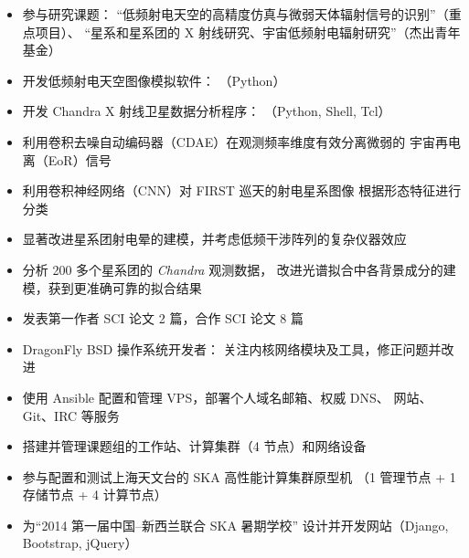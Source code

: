 \documentclass[zh]{resume}
\begin{document}
\begin{itemize}
  \item 参与研究课题：
    \enquote{低频射电天空的高精度仿真与微弱天体辐射信号的识别}（重点项目）、
    \enquote{星系和星系团的 X 射线研究、宇宙低频射电辐射研究}（杰出青年基金）
  \item 开发低频射电天空图像模拟软件：
    （Python）
  \item 开发 Chandra X 射线卫星数据分析程序：
    （Python, Shell, Tcl）
  \item 利用卷积去噪自动编码器（CDAE）在观测频率维度有效分离微弱的
    宇宙再电离（EoR）信号
  \item 利用卷积神经网络（CNN）对 FIRST 巡天的射电星系图像
    根据形态特征进行分类
  \item 显著改进星系团射电晕的建模，并考虑低频干涉阵列的复杂仪器效应
  \item 分析 200 多个星系团的 \textit{Chandra} 观测数据，
    改进光谱拟合中各背景成分的建模，获到更准确可靠的拟合结果
  \item 发表第一作者 SCI 论文 2 篇，合作 SCI 论文 8 篇
\end{itemize}

\begin{itemize}
  \item DragonFly BSD 操作系统开发者：
    关注内核网络模块及工具，修正问题并改进
  \item 使用 Ansible 配置和管理 VPS，部署个人域名邮箱、权威 DNS、
    网站、Git、IRC 等服务
  \item 搭建并管理课题组的工作站、计算集群（4 节点）和网络设备
  \item 参与配置和测试上海天文台的 SKA 高性能计算集群原型机
    （1 管理节点 + 1 存储节点 + 4 计算节点）
  \item 为\enquote{2014 第一届中国--新西兰联合 SKA 暑期学校}
    设计并开发网站（Django, Bootstrap, jQuery）
\end{itemize}
\end{document}
